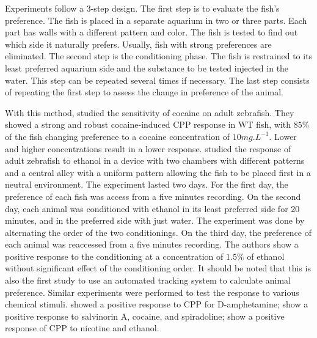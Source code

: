     Experiments follow a 3-step design.
    The first step is to evaluate the fish's preference. The fish is placed in a separate aquarium in two or three parts. Each part has walls with a different pattern and color. The fish is tested to find out which side it naturally prefers. Usually, fish with strong preferences are eliminated.
    The second step is the conditioning phase. The fish is restrained to its least preferred aquarium side and the substance to be tested injected in the water. This step can be repeated several times if necessary.
    The last step consists of repeating the first step to assess the change in preference of the animal.

    With this method, \cite{darland2001behavioral} studied the sensitivity of cocaine on adult zebrafish. They showed a strong and robust cocaine-induced CPP response in WT fish, with $85\%$ of the fish changing preference to a cocaine concentration of $10mg.L^{-1}$. Lower and higher concentrations result in a lower response.
    \cite{mathur2011preference} studied the response of adult zebrafish to ethanol in a device with two chambers with different patterns and a central alley with a uniform pattern allowing the fish to be placed first in a neutral environment. The experiment lasted two days. For the first day, the preference of each fish was access from a five minutes recording. On the second day, each animal was conditioned with ethanol in its least preferred side for 20 minutes, and in the preferred side with just water. The experiment was done by alternating the order of the two conditionings. On the third day, the preference of each animal was reaccessed from a five minutes recording. The authors show a positive response to the conditioning at a concentration of $1.5\%$ of ethanol without significant effect of the conditioning order. It should be noted that this is also the first study to use an automated tracking system to calculate animal preference.
    Similar experiments were performed to test the response to various chemical stimuli. \cite{ninkovic2006genetic, ninkovic2006zebrafish} showed a positive response to CPP for D-amphetamine; \cite{braida2007hallucinatory} show a positive response to salvinorin A, cocaine, and spiradoline; \cite{kedikian2013behavioral, } show a positive response of CPP to nicotine and ethanol.

